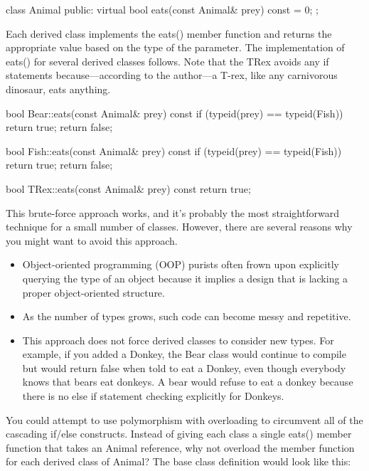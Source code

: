 \begin{cpp}
class Animal
{
    public:
        virtual bool eats(const Animal& prey) const = 0;
};
\end{cpp}

Each derived class implements the eats() member function and returns the appropriate value based on the type of the parameter. The implementation of eats() for several derived classes follows. Note that the TRex avoids any if statements because—according to the author—a T-rex, like any carnivorous dinosaur, eats anything.

\begin{cpp}
bool Bear::eats(const Animal& prey) const
{
    if (typeid(prey) == typeid(Fish)) { return true; }
    return false;
}

bool Fish::eats(const Animal& prey) const
{
    if (typeid(prey) == typeid(Fish)) { return true; }
    return false;
}

bool TRex::eats(const Animal& prey) const
{
    return true;
}
\end{cpp}

This brute-force approach works, and it’s probably the most straightforward technique for a small number of classes. However, there are several reasons why you might want to avoid this approach.

\begin{itemize}
\item
Object-oriented programming (OOP) purists often frown upon explicitly querying the type of an object because it implies a design that is lacking a proper object-oriented structure.

\item
As the number of types grows, such code can become messy and repetitive.

\item
This approach does not force derived classes to consider new types. For example, if you added a Donkey, the Bear class would continue to compile but would return false when told to eat a Donkey, even though everybody knows that bears eat donkeys. A bear would refuse to eat a donkey because there is no else if statement checking explicitly for Donkeys.
\end{itemize}


You could attempt to use polymorphism with overloading to circumvent all of the cascading if/else constructs. Instead of giving each class a single eats() member function that takes an Animal reference, why not overload the member function for each derived class of Animal? The base class definition would look like this:

